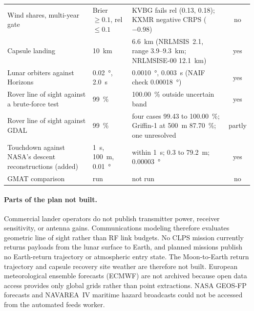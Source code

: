 \documentclass[11pt,a4paper]{article}
\begin{document}
\begin{table}[htbp]
\begin{tabularx}{\textwidth}{@{}p{}lYc@{}}
Wind shares, multi-year gate & Brier $\geq 0.1$, rel $\leq 0.1$ & KVBG fails rel (0.13, 0.18); KXMR negative CRPS ($-0.98$) & no \\
Capsule landing & \qty{10}{\km} & \qty{6.6}{\km} (NRLMSIS~2.1, range 3.9--\qty{9.3}{\km}; NRLMSISE-00 \qty{12.1}{\km}) & yes \\
Lunar orbiters against Horizons & \qty{0.02}{\degree}, \qty{2.0}{\s} & \qty{0.0010}{\degree}, \qty{0.003}{\s} (NAIF check \qty{0.00018}{\degree}) & yes \\
Rover line of sight against a brute-force test & \qty{99}{\percent} & \qty{100.00}{\percent} outside uncertain band & yes \\
Rover line of sight against GDAL & \qty{99}{\percent} & four cases 99.43 to \qty{100.00}{\percent}; Griffin-1 at \qty{500}{\m} \qty{87.70}{\percent}; one unresolved & partly \\
Touchdown against NASA's descent reconstructions (added) & \qty{1}{\s}, \qty{100}{\m}, \qty{0.01}{\degree} & within \qty{1}{\s}; 0.3 to \qty{79.2}{\m}; \qty{0.00003}{\degree} & yes \\
GMAT comparison & run & not run & no \\
\bottomrule
\end{tabularx}
\end{table}

\paragraph{Parts of the plan not built.} Commercial lander operators do not publish transmitter
power, receiver sensitivity, or antenna gains. Communications modeling therefore evaluates
geometric line of sight rather than RF link budgets. No CLPS mission currently returns
payloads from the lunar surface to Earth, and planned missions publish no Earth-return
trajectory or atmospheric entry state. The Moon-to-Earth return trajectory and capsule
recovery site weather are therefore not built. European meteorological ensemble forecasts
(ECMWF) are not archived because open data access provides only global grids rather than point
extractions. NASA GEOS-FP forecasts and NAVAREA~IV maritime hazard broadcasts could not be
accessed from the automated feeds worker.
\end{document}
